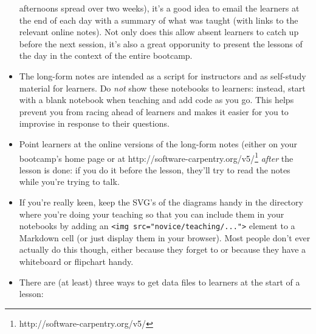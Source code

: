 \documentclass[]{book}
\newcommand{\urlfoot}[2]{{#1}\footnote{#2}}
\begin{document}
\begin{itemize}
  afternoons spread over two weeks), it's a good idea to email the
  learners at the end of each day with a summary of what was taught
  (with links to the relevant online notes). Not only does this allow
  absent learners to catch up before the next session, it's also a great
  opporunity to present the lessons of the day in the context of the
  entire bootcamp.
\item
  The long-form notes are intended as a script for instructors and as
  self-study material for learners. Do \emph{not} show these notebooks
  to learners: instead, start with a blank notebook when teaching and
  add code as you go. This helps prevent you from racing ahead of
  learners and makes it easier for you to improvise in response to their
  questions.
\item
  Point learners at the online versions of the long-form notes (either
  on your bootcamp's home page or at
  \urlfoot{http://software-carpentry.org/v5/}{http://software-carpentry.org/v5/}
  \emph{after} the lesson is done: if you do it before the lesson,
  they'll try to read the notes while you're trying to talk.
\item
  If you're really keen, keep the SVG's of the diagrams handy in the
  directory where you're doing your teaching so that you can include
  them in your notebooks by adding an
  \texttt{\textless{}img src="novice/teaching/..."\textgreater{}}
  element to a Markdown cell (or just display them in your browser).
  Most people don't ever actually do this though, either because they
  forget to or because they have a whiteboard or flipchart handy.
\item
  There are (at least) three ways to get data files to learners at the
  start of a lesson:


\end{itemize}
\end{document}
